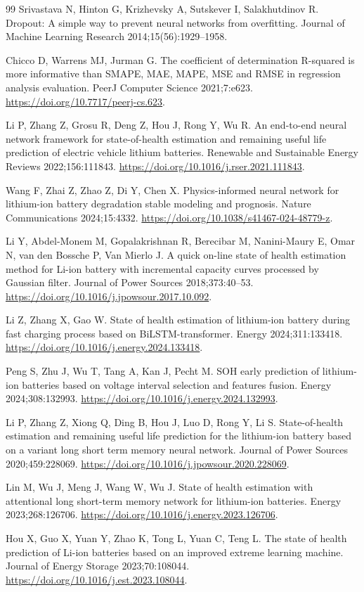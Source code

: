 \begin{thebibliography}{99}
 Srivastava N, Hinton G, Krizhevsky A, Sutskever I, Salakhutdinov R. Dropout: A simple way to prevent neural networks from overfitting. Journal of Machine Learning Research 2014;15(56):1929–1958.

 Chicco D, Warrens MJ, Jurman G. The coefficient of determination R-squared is more informative than SMAPE, MAE, MAPE, MSE and RMSE in regression analysis evaluation. PeerJ Computer Science 2021;7:e623. \url{https://doi.org/10.7717/peerj-cs.623}.

 Li P, Zhang Z, Grosu R, Deng Z, Hou J, Rong Y, Wu R. An end-to-end neural network framework for state-of-health estimation and remaining useful life prediction of electric vehicle lithium batteries. Renewable and Sustainable Energy Reviews 2022;156:111843. \url{https://doi.org/10.1016/j.rser.2021.111843}.

 Wang F, Zhai Z, Zhao Z, Di Y, Chen X. Physics-informed neural network for lithium-ion battery degradation stable modeling and prognosis. Nature Communications 2024;15:4332. \url{https://doi.org/10.1038/s41467-024-48779-z}.

 Li Y, Abdel-Monem M, Gopalakrishnan R, Berecibar M, Nanini-Maury E, Omar N, van den Bossche P, Van Mierlo J. A quick on-line state of health estimation method for Li-ion battery with incremental capacity curves processed by Gaussian filter. Journal of Power Sources 2018;373:40--53. \url{https://doi.org/10.1016/j.jpowsour.2017.10.092}.

 Li Z, Zhang X, Gao W. State of health estimation of lithium-ion battery during fast charging process based on BiLSTM-transformer. Energy 2024;311:133418. \url{https://doi.org/10.1016/j.energy.2024.133418}.

 Peng S, Zhu J, Wu T, Tang A, Kan J, Pecht M. SOH early prediction of lithium-ion batteries based on voltage interval selection and features fusion. Energy 2024;308:132993. \url{https://doi.org/10.1016/j.energy.2024.132993}.

 Li P, Zhang Z, Xiong Q, Ding B, Hou J, Luo D, Rong Y, Li S. State-of-health estimation and remaining useful life prediction for the lithium-ion battery based on a variant long short term memory neural network. Journal of Power Sources 2020;459:228069. \url{https://doi.org/10.1016/j.jpowsour.2020.228069}.

 Lin M, Wu J, Meng J, Wang W, Wu J. State of health estimation with attentional long short-term memory network for lithium-ion batteries. Energy 2023;268:126706. \url{https://doi.org/10.1016/j.energy.2023.126706}.

 Hou X, Guo X, Yuan Y, Zhao K, Tong L, Yuan C, Teng L. The state of health prediction of Li-ion batteries based on an improved extreme learning machine. Journal of Energy Storage 2023;70:108044. \url{https://doi.org/10.1016/j.est.2023.108044}.

\end{thebibliography}

\endgroup
